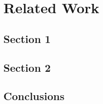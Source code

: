\chapter{Related Work} \label{chap:litreview}

\section{Section 1}

\section{Section 2}

\section{Conclusions}
